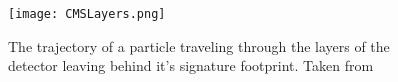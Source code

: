 \begin{figure}[h]
	\centering
	\texttt{[image: CMSLayers.png]}
	\caption[Particle trajectories and footprint in CMS]{The trajectory of a particle traveling through the layers of the detector leaving behind it's signature footprint. Taken from \cite{How_CMS_detecs}}
	\label{CMSLayers}
\end{figure}



